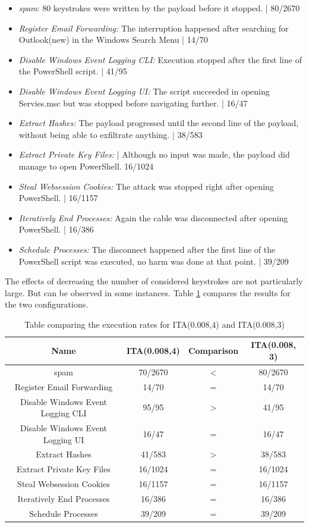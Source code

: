 \begin{itemize}
    \item  \emph{spam}: 80 keystrokes were written by the payload before it stopped. | 80/2670
    \item  \emph{Register Email Forwarding:} The interruption happened after searching for Outlook(new) in the Windows Search Menu  | 14/70 
    \item  \emph{Disable Windows Event Logging CLI:}  Execution stopped after the first line of the PowerShell script. | 41/95
    \item  \emph{Disable Windows Event Logging UI:} The script succeeded in opening Servies.msc but was stopped before navigating further. | 16/47
    \item  \emph{Extract Hashes:}  The payload progressed until the second line of the payload, without being able to exfiltrate anything. | 38/583
    \item  \emph{Extract Private Key Files:}  | Although no input was made, the payload did manage to open PowerShell. 16/1024
    \item  \emph{Steal Websession Cookies:} The attack was stopped right after opening PowerShell. | 16/1157
    \item  \emph{Iteratively End Processes:} Again the cable was disconnected after opening PowerShell. | 16/386
    \item  \emph{Schedule Processes:} The disconnect happened after the first line of the PowerShell script was executed, no harm was done at that point. | 39/209
\end{itemize}



The effects of decreasing the number of considered keystrokes are not particularly large. But can be observed in some instances. Table \ref{table:ITA_vs_ITA} compares the results for the two configurations. 

\begin{table}[h]
\centering
\begin{tabular}{|c|c|c|c|}
\hline
Name & ITA(0.008,4) & Comparison & ITA(0.008, 3) \\
\hline
spam & 70/2670 & < & 80/2670 \\
\hline
Register Email Forwarding & 14/70 & = &  14/70 \\
\hline
Disable Windows Event Logging CLI & 95/95 & > & 41/95 \\
\hline
Disable Windows Event Logging UI & 16/47 & = &  16/47 \\ 
\hline
Extract Hashes & 41/583 & > &  38/583 \\
\hline
Extract Private Key Files &  16/1024 & = &  16/1024 \\
\hline
Steal Websession Cookies &  16/1157 & = & 16/1157 \\
\hline
Iteratively End Processes & 16/386 & = & 16/386 \\
\hline
Schedule Processes & 39/209 & = & 39/209 \\
\hline
\end{tabular}
\caption{Table comparing the execution rates for ITA(0.008,4) and ITA(0.008,3)}
\label{table:ITA_vs_ITA}
\end{table}


